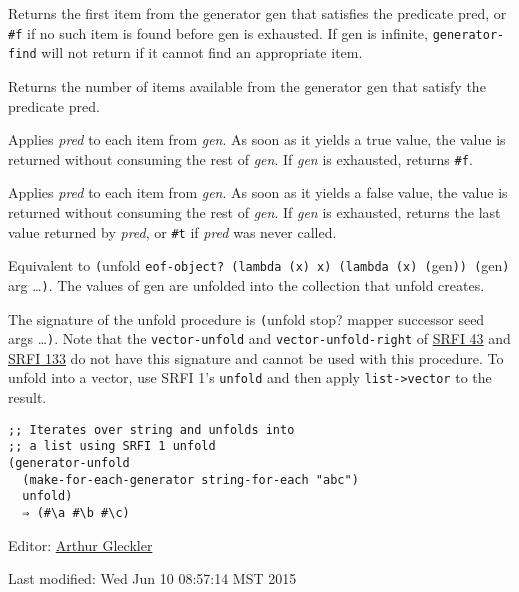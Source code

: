 \begin{entry}{%
  }

Returns the first item from the generator gen that satisfies the
predicate pred, or \texttt{\#f} if no such item is found before gen is
exhausted. If gen is infinite, \texttt{generator-find} will not return
if it cannot find an appropriate item.
\end{entry}

\begin{entry}{%
  }

Returns the number of items available from the generator gen that
satisfy the predicate pred.
\end{entry}

\begin{entry}{%
  }


Applies \emph{pred} to each item from \emph{gen}. As soon as it yields a
true value, the value is returned without consuming the rest of
\emph{gen}. If \emph{gen} is exhausted, returns \texttt{\#f}.
\end{entry}

\begin{entry}{%
  }


Applies \emph{pred} to each item from \emph{gen}. As soon as it yields a
false value, the value is returned without consuming the rest of
\emph{gen}. If \emph{gen} is exhausted, returns the last value returned
by \emph{pred}, or \texttt{\#t} if \emph{pred} was never called.
\end{entry}

\begin{entry}{%
  }

Equivalent to \texttt{(}unfold
\texttt{eof-object?\ (lambda\ (x)\ x)\ (lambda\ (x)\ (}gen\texttt{))\ (}gen\texttt{)}
arg \ldots{}\texttt{)}. The values of gen are unfolded into the
collection that unfold creates.

The signature of the unfold procedure is \texttt{(}unfold stop? mapper
successor seed args \ldots{}\texttt{)}. Note that the
\texttt{vector-unfold} and \texttt{vector-unfold-right} of
\href{http://srfi.schemers.org/srfi-43/srfi-43.html}{SRFI 43} and
\href{http://srfi.schemers.org/srfi-133/srfi-133.html}{SRFI 133} do not
have this signature and cannot be used with this procedure. To unfold
into a vector, use SRFI 1's \texttt{unfold} and then apply
\texttt{list->vector} to the result.

\begin{verbatim}
;; Iterates over string and unfolds into 
;; a list using SRFI 1 unfold
(generator-unfold 
  (make-for-each-generator string-for-each "abc") 
  unfold)
  ⇒ (#\a #\b #\c)
\end{verbatim}
\end{entry}

Editor:
\href{mailto:srfi-editors\%20at\%20srfi\%20dot\%20schemers\%20\%20\%20\%20dot\%20org}{Arthur
Gleckler}

Last modified: Wed Jun 10 08:57:14 MST 2015
